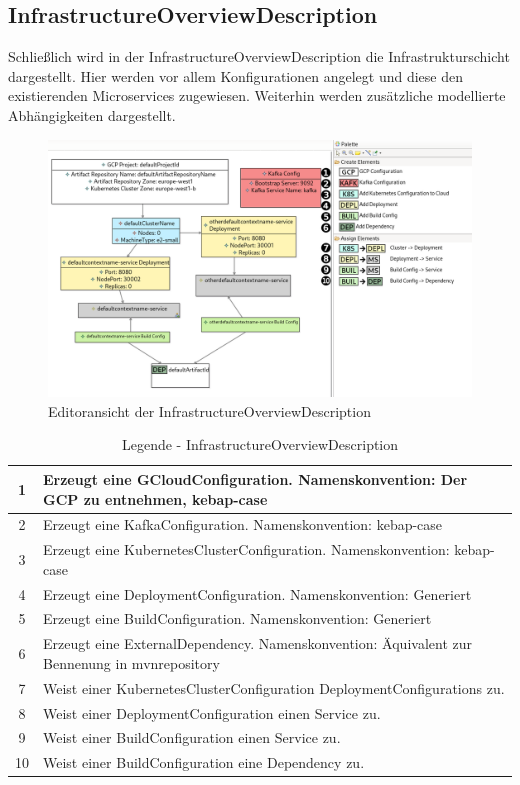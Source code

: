 \newpage
\subsection{InfrastructureOverviewDescription}

Schließlich wird in der \glqq InfrastructureOverviewDescription\grqq{} die Infrastrukturschicht dargestellt. Hier werden vor allem Konfigurationen angelegt und diese den existierenden Microservices zugewiesen. Weiterhin werden zusätzliche modellierte Abhängigkeiten dargestellt.

\begin{figure}[ht]
\centering
\includegraphics[width=\textwidth]{bilder/k5/6.png}
\caption{Editoransicht der InfrastructureOverviewDescription}
\end{figure}

\begin{table}[h]
\centering
\footnotesize
\begin{tabularx}{\textwidth}{|c|X|}
\hline
1 & Erzeugt eine GCloudConfiguration. Namenskonvention: Der GCP zu entnehmen, kebap-case \\ \hline
2 & Erzeugt eine KafkaConfiguration. Namenskonvention: kebap-case \\ \hline
3 & Erzeugt eine KubernetesClusterConfiguration. Namenskonvention: kebap-case \\ \hline
4 & Erzeugt eine DeploymentConfiguration. Namenskonvention: Generiert \\ \hline
5 & Erzeugt eine BuildConfiguration. Namenskonvention: Generiert \\ \hline
6 & Erzeugt eine ExternalDependency. Namenskonvention: Äquivalent zur Bennenung in mvnrepository \\ \hline
7 & Weist einer KubernetesClusterConfiguration DeploymentConfigurations zu. \\ \hline
8 & Weist einer DeploymentConfiguration einen Service zu. \\ \hline
9 & Weist einer BuildConfiguration einen Service zu. \\ \hline
10 & Weist einer BuildConfiguration eine Dependency zu. \\ \hline
\end{tabularx}
\caption{Legende - InfrastructureOverviewDescription}
\end{table}

